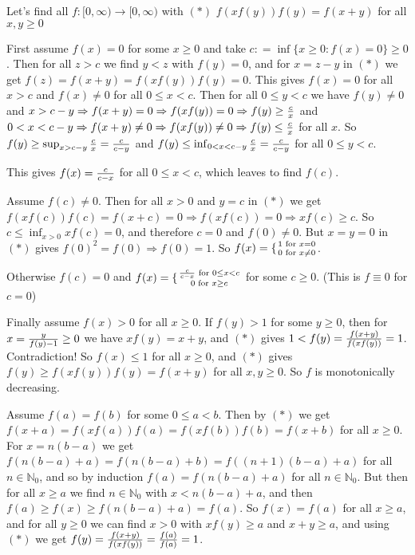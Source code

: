 \begin{solution}
	Let's find all $ f: [0,\infty)\to [0,\infty)$ with
$ (*)$ $ f(xf(y))f(y) = f(x + y)$ for all $ x,y\ge 0$

First assume $ f(x) = 0$ for some $ x\ge 0$ and take $ c: = \inf\{x\ge 0: f(x) = 0\}\ge 0$.
Then for all $ z > c$ we find $ y < z$ with $ f(y) = 0$, 
and for $ x = z - y$ in $ (*)$ we get $ f(z) = f(x + y) = f(xf(y))f(y) = 0$.
This gives $ f(x) = 0$ for all $ x > c$ and $ f(x)\not = 0$ for all $ 0\le x < c$.
Then for all $ 0\le y < c$ we have $ f(y)\not = 0$ and
$ x > c - y\Rightarrow f(x + y) = 0 \Rightarrow f(xf(y)) = 0 \Rightarrow f(y)\ge {c\over x}$
and
$ 0 < x < c - y\Rightarrow f(x + y)\not = 0 \Rightarrow f(xf(y))\not = 0 \Rightarrow f(y)\le {c\over x}$
for all $ x$.
So $ f(y)\ge \sup_{x > c - y}{c\over x} = {c\over c - y}$ and $ f(y)\le \inf_{0 < x < c - y}{c\over x} = {c\over c - y}$ for all $ 0\le y < c$.

This gives $ f(x) = {c\over c - x}$ for all $ 0\le x < c$, 
which leaves to find $ f(c)$.

Assume $ f(c)\not = 0$.
Then for all $ x > 0$ and $ y = c$ in $ (*)$ we get 
$ f(xf(c))f(c) = f(x + c) = 0\Rightarrow f(xf(c)) = 0\Rightarrow xf(c)\ge c$.
So $ c\le \inf_{x > 0}xf(c) = 0$, and therefore $ c = 0$ and $ f(0)\not = 0$.
But $ x = y = 0$ in $ (*)$ gives $ f(0)^2 = f(0)\Rightarrow f(0) = 1$.
So $ f(x) = \{ {1\text{ for }x = 0\atop 0\text{ for }x\not = 0}$.

Otherwise $ f(c) = 0$ and
$ f(x) = \{ {{c\over c - x}\text{ for }0\le x < c\atop 0\text{ for }x\ge c}$
for some $ c\ge 0$.
(This is $ f\equiv 0$ for $ c = 0$)


Finally assume $ f(x) > 0$ for all $ x\ge 0$.
If $ f(y) > 1$ for some $ y\ge 0$, then for $ x = {y\over f(y) - 1}\ge 0$ we have $ xf(y) = x + y$,
and $ (*)$ gives $ 1 < f(y) = {f(x + y)\over f(xf(y))} = 1$. Contradiction!
So $ f(x)\le 1$ for all $ x\ge 0$, and $ (*)$ gives $ f(y)\ge f(xf(y))f(y) = f(x + y)$ for all $ x,y\ge 0$.
So $ f$ is monotonically decreasing.

Assume $ f(a) = f(b)$ for some $ 0\le a < b$.
Then by $ (*)$ we get $ f(x + a) = f(xf(a))f(a) = f(xf(b))f(b) = f(x + b)$ for all $ x\ge 0$.
For $ x = n(b - a)$ we get $ f(n(b - a) + a) = f(n(b - a) + b) = f((n + 1)(b - a) + a)$ for all $ n\in\mathbb{N}_0$,
and so by induction $ f(a) = f(n(b - a) + a)$ for all $ n\in\mathbb{N}_0$.
But then for all $ x\ge a$ we find $ n\in\mathbb{N}_0$ with $ x < n(b - a) + a$,
and then $ f(a)\ge f(x)\ge f(n(b - a) + a) = f(a)$.
So $ f(x) = f(a)$ for all $ x\ge a$,
and for all $ y\ge 0$ we can find $ x > 0$ with $ xf(y)\ge a$ and $ x + y\ge a$,
and using $ (*)$ we get $ f(y) = {f(x + y)\over f(xf(y))} = {f(a)\over f(a)} = 1$.


\end{solution}
